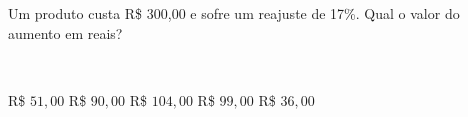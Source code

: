 \parbox{\linewidth}{

Um produto custa R\$ 300,00 e sofre um reajuste de 17\%. Qual o valor do aumento em reais?}
\vspace{2mm}
\\\parbox{\linewidth}{

R\$ $51{,}00$
R\$ $90{,}00$
R\$ $104{,}00$
R\$ $99{,}00$
R\$ $36{,}00$

}

